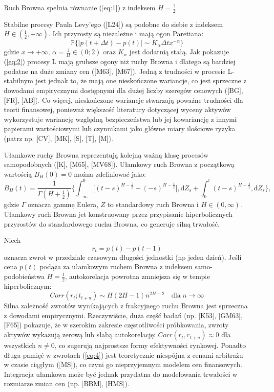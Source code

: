 \documentclass[12pt]{article}
\theoremstyle{definition}
\begin{document}
Ruch Browna spełnia równanie (\ref{eq:1}) z indeksem $H=\frac{1}{2}$

Stabilne procesy Paula Levy'ego ([L24]) są podobne do siebie z indeksem $H \in (\frac{1}{2}, + \infty)$. Ich przyrosty są niezależne i mają ogon Paretiana:
\begin{equation}
\label{eq:2}
\mathbb{P} \lbrace \vert p(t+ \Delta t)-p(t) \vert \sim  K_{\alpha}\Delta t x^{-\alpha} \rbrace
\end{equation}
gdzie $x \to +\infty$, $\alpha = \frac{1}{H} \in (0;2)$ oraz $K_{\alpha}$ jest dodatnią stałą. Jak pokazuje  (\ref{eq:2}) procesy L mają grubsze ogony niż ruchy Browna i dlatego są bardziej podatne na duże zmiany cen ([M63], [M67]). Jedną z trudności w procesie L-stabilnym jest jednak to, że mają one nieskończone wariancje, co jest sprzeczne z dowodami empirycznymi dostępnymi dla dużej liczby szeregów cenowych ([BG], [FR], [AB]). Co więcej, nieskończone wariancje stwarzają poważne trudności dla teorii finansowej, ponieważ większość literatury dotyczącej wyceny aktywów wykorzystuje wariancję względną bezpieczeństwa lub jej kowariancję z innymi papierami wartościowymi lub czynnikami jako główne miary ilościowe ryzyka (patrz np. [CV], [MK], [S], [T], [M]).

Ułamkowe ruchy Browna reprezentują kolejną ważną klasę procesów samopodobnych ([K], [M65], [MV68]). Ułamkowy ruch Browna z początkową wartością $B_H (0) = 0$ można zdefiniować jako:
$$B_H(t) = \frac{1}{\Gamma(H+\frac{1}{2})} \bigg\lbrace \int_{-\infty}^{0} \big[(t-s)^{H-\frac{1}{2}} -(-s)^{H-\frac{1}{2}}\big], \mathrm{d} Z_s + \int_{0}^{t} (t-s)^{H-\frac{1}{2}}, \mathrm{d} Z_s \bigg\rbrace,$$
gdzie $\Gamma$ oznacza gammę Eulera, $Z$ to standardowy ruch Browna i $H \in (0, \infty)$. Ułamkowy ruch Browna jet konstruowany przez przypisanie hiperbolicznych przyrostów do standardowego ruchu Browna, co generuje silną trwałość. 

Niech
\begin{equation}
\label{eq:3}
r_t = p(t)-p(t-1)
\end{equation}
oznacza zwrot w przedziale czasowym długości jednostki (np jeden dzień). Jeśli cena $p(t)$ podąża za ułamkowym ruchem Browna z indeksem samo-podobieństwa $H = \frac{1}{2}$, autokorelacja powrotna zmniejsza się w tempie hiperbolicznym:
\begin{equation}
\label{eq:4}
Corr(r_t;t_{t+n}) \sim H(2H-1)n^{2H-2} \quad \text{dla} \; n \to \infty
\end{equation}
Silna zależność zwrotów wynikających z frakcyjnego ruchu Browna jest sprzeczna z dowodami empirycznymi. Rzeczywiście, duża część badań (np. [K53], [GM63], [F65]) pokazuje, że w szerokim zakresie częstotliwości próbkowania, zwroty aktywów wykazują zerową lub słabą autokorelację: $Corr (r_t, r_{t + n}) \approx 0$ dla wszystkich $n \neq 0$, co sugerują najprostsze formy efektywności rynkowej. Ponadto długa pamięć w zwrotach (\ref{eq:4}) jest teoretycznie niespójna z cenami arbitrażu w czasie ciągłym ([MS]), co czyni go nieprzyjemnym modelem cen finansowych. Integracja ułamkowa może być jednak przydatna do modelowania trwałości w rozmiarze zmian cen (np. [BBM], [HMS]).
\end{document}
